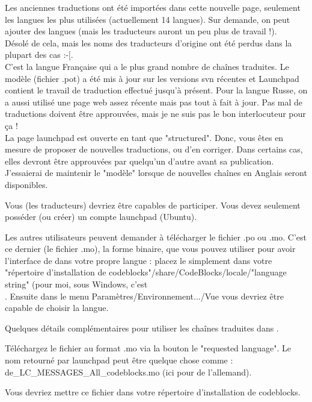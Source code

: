 Les anciennes traductions ont été importées dans cette nouvelle page, seulement les langues les plus utilisées (actuellement 14 langues). Sur demande, on peut ajouter des langues (mais les traducteurs auront un peu plus de travail !).\\
Désolé de cela, mais les noms des traducteurs d'origine ont été perdus dans la plupart des cas  :-[. \\
C'est la langue Française qui a le plus grand nombre de chaînes traduites. Le modèle (fichier .pot) a été mis à jour sur les versions svn récentes et Launchpad contient le travail de traduction effectué jusqu'à présent. Pour la langue Russe, on a aussi utilisé une page web assez récente mais pas tout à fait à jour. Pas mal de traductions doivent être approuvées, mais je ne suis pas le bon interlocuteur pour ça !\\
La page launchpad est ouverte en tant que "structured". Donc, vous êtes en mesure de proposer de nouvelles traductions, ou d'en corriger. Dans certains cas, elles devront être approuvées par quelqu'un d'autre avant sa publication.\\
J'essaierai de maintenir le "modèle" lorsque de nouvelles chaînes en Anglais seront disponibles.

Vous (les traducteurs) devriez être capables de participer. Vous devez seulement posséder (ou créer) un compte launchpad (Ubuntu).

Les autres utilisateurs peuvent demander à télécharger le fichier .po ou .mo. C'est ce dernier (le fichier .mo), la forme binaire, que vous pouvez utiliser pour avoir l'interface de \codeblocks dans votre propre langue : placez le simplement dans votre "répertoire d'installation de codeblocks"/share/CodeBlocks/locale/"language string" (pour moi, sous Windows, c'est\\ . Ensuite dans le menu Paramètres/Environnement.../Vue vous devriez être capable de choisir la langue.

Quelques détails complémentaires pour utiliser les chaînes traduites dans \codeblocks.

Téléchargez le fichier au format .mo via la bouton le "requested language". Le nom retourné par launchpad peut être quelque chose comme : de\_LC\_MESSAGES\_All\_codeblocks.mo (ici pour de l'allemand).

Vous devriez mettre ce fichier dans votre répertoire d'installation de codeblocks.

